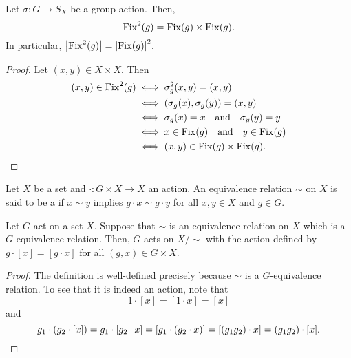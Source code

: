 \begin{prop} \label{prop:fix2isfix2}
	Let $\sigma : G \to S_X$ be a group action. Then,
	\begin{equation*} 
		\operatorname{Fix}^2(g) = \operatorname{Fix}(g) \times \operatorname{Fix}(g).
	\end{equation*}
	In particular, ${\left\lvert \operatorname{Fix}^2(g) \right\lvert} = {\left\lvert \operatorname{Fix}(g) \right\lvert}^2.$
\end{prop}

\begin{proof} 
	Let $(x, y) \in X \times X.$ Then
	\begin{align*} 
		(x, y) \in \operatorname{Fix}^2(g) &\iff \sigma^2_g(x, y) = (x, y)\\
		& \iff (\sigma_g(x), \sigma_g(y)) = (x, y)\\
		& \iff \sigma_g(x) = x \quad\text{and}\quad \sigma_y(y) = y\\
		& \iff x \in \operatorname{Fix}(g) \quad\text{and}\quad y \in \operatorname{Fix}(g)\\
		& \iff (x, y) \in \operatorname{Fix}(g) \times \operatorname{Fix}(g). \qedhere
	\end{align*}
\end{proof}

\begin{defn}%
	\label{defn:leftcongruence}
	Let $X$ be a set and $\cdot : G \times X \to X$ an action. An equivalence relation $\sim$ on $X$ is said to be a  if $x \sim y$ implies $g \cdot x \sim g \cdot y$ for all $x, y \in X$ and $g \in G.$
\end{defn}

\begin{prop} \label{prop:leftcongruence}
	Let $G$ act on a set $X.$ Suppose that $\sim$ is an equivalence relation on $X$ which is a $G$-equivalence relation. Then, $G$ acts on $X/{\sim}$ with the action defined by $g \cdot [x] = [g \cdot x]$ for all $(g, x) \in G \times X.$
\end{prop}
\begin{proof} 
	The definition is well-defined precisely because $\sim$ is a $G$-equivalence relation. To see that it is indeed an action, note that 
	\begin{equation*} 
		1 \cdot [x] = [1 \cdot x] = [x]
	\end{equation*}
	and
	\begin{equation*} 
		g_1 \cdot (g_2 \cdot [x]) = g_1 \cdot [g_2 \cdot x] = [g_1 \cdot (g_2 \cdot x)] = [(g_1 g_2) \cdot x] = (g_1 g_2) \cdot [x]. \qedhere
	\end{equation*}
\end{proof}

